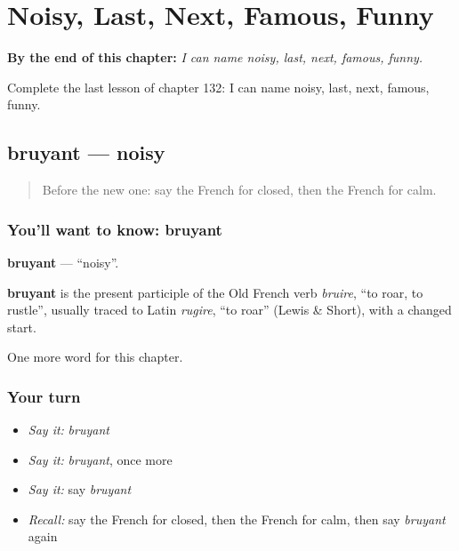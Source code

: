 
\chapter{Noisy, Last, Next, Famous, Funny}
\label{ch:fr-noisy-last-next-famous-funny}

\begin{chapteropening}
\textbf{By the end of this chapter:} \emph{I can name noisy, last, next, famous, funny.}

Complete the last lesson of chapter 132: I can name noisy, last, next, famous, funny.
\end{chapteropening}

\section[bruyant]{bruyant — noisy}

\label{lesson:FR-C132-bruyant}



\begin{quote}
Before the new one: say the French for closed, then the French for calm.
\end{quote}

\subsection*{You'll want to know: bruyant}
\textbf{bruyant} — \textquotedblleft{}noisy\textquotedblright{}.

\begin{cousinweb}
\textbf{bruyant} is the present participle of the Old French verb \emph{bruire}, \textquotedblleft{}to roar, to rustle\textquotedblright{}, usually traced to Latin \emph{rugire}, \textquotedblleft{}to roar\textquotedblright{} (Lewis \& Short), with a changed start.
\end{cousinweb}

\begin{grammarlens}[title={What you've built}]
One more word for this chapter.
\end{grammarlens}

\subsection*{Your turn}
\begin{itemize}
\raggedright
  \item \emph{Say it:} \emph{bruyant}
  \item \emph{Say it:} \emph{bruyant}, once more
  \item \emph{Say it:} say \emph{bruyant}
  \item \emph{Recall:} say the French for closed, then the French for calm, then say \emph{bruyant} again
\end{itemize}

